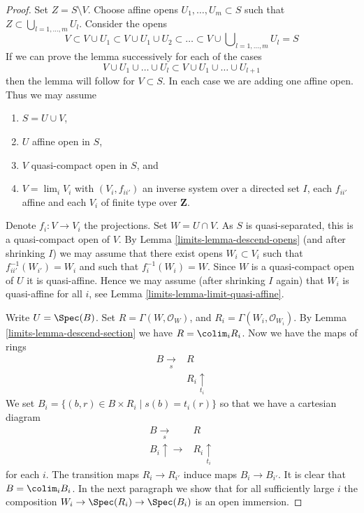 \begin{proof}

Set $Z = S \setminus V$. Choose affine opens $U_1, \ldots, U_m \subset S$
such that $Z \subset \bigcup_{l = 1, \ldots, m} U_l$. Consider the opens
$$
V \subset V \cup U_1 \subset V \cup U_1 \cup U_2 \subset
\ldots \subset V \cup \bigcup\nolimits_{l = 1, \ldots, m} U_l = S
$$
If we can prove the lemma successively for each of the cases
$$
V \cup U_1 \cup \ldots \cup U_l
\subset
V \cup U_1 \cup \ldots \cup U_{l + 1}
$$
then the lemma will follow for $V \subset S$. In each case we are adding
one affine open. Thus we may assume
\begin{enumerate}
\item $S = U \cup V$,
\item $U$ affine open in $S$,
\item $V$ quasi-compact open in $S$, and
\item $V = \lim_i V_i$ with $(V_i, f_{ii'})$
an inverse system over a directed set $I$, each $f_{ii'}$
affine and each $V_i$ of finite type over $\mathbf{Z}$.
\end{enumerate}
Denote $f_i : V \to V_i$ the projections.
Set $W = U \cap V$. As $S$ is quasi-separated, this is a quasi-compact open
of $V$. By Lemma \ref{limits-lemma-descend-opens}
(and after shrinking $I$) we may assume that there exist
opens $W_i \subset V_i$ such that $f_{ii'}^{-1}(W_{i'}) = W_i$
and such that $f_i^{-1}(W_i) = W$. Since $W$ is a quasi-compact open
of $U$ it is quasi-affine. Hence we may assume (after shrinking $I$ again)
that $W_i$ is quasi-affine for all $i$, see
Lemma \ref{limits-lemma-limit-quasi-affine}.

\medskip\noindent
Write $U = \Spec(B)$. Set $R = \Gamma(W, \mathcal{O}_W)$,
and $R_i = \Gamma(W_i, \mathcal{O}_{W_i})$.
By Lemma \ref{limits-lemma-descend-section} we have $R = \colim_i R_i$.
Now we have the maps of rings
$$
\begin{array}{cc}B \underset{s}{\longrightarrow} & R \\  & R_i \underset{t_i}{\uparrow}\end{array}
$$
We set $B_i = \{(b, r) \in B \times R_i \mid s(b) = t_i(r)\}$ so that we
have a cartesian diagram
$$
\begin{array}{cc}B \underset{s}{\longrightarrow} & R \\ B_i \uparrow\longrightarrow & R_i \underset{t_i}{\uparrow}\end{array}
$$
for each $i$. The transition maps $R_i \to R_{i'}$ induce maps
$B_i \to B_{i'}$. It is clear that $B = \colim_i B_i$.
In the next paragraph we show that for all sufficiently large $i$
the composition $W_i \to \Spec(R_i) \to \Spec(B_i)$ is an open immersion.


\end{proof}
